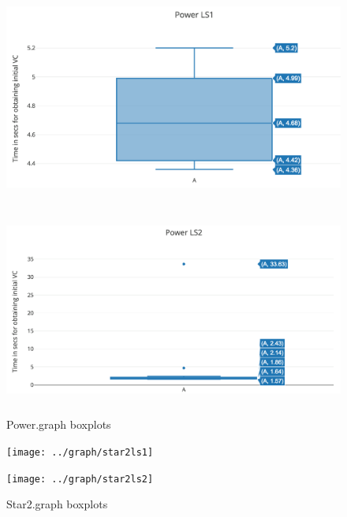 \begin{figure}[H]
\centering
\caption{Power.graph boxplots}
\begin{minipage}[b]{0.4\textwidth}
\includegraphics[height=7cm]{../graph/powerls1}
\end{minipage}
\hspace{0.6in}
\begin{minipage}[b]{0.4\textwidth}
\centering
\includegraphics[height=7cm]{../graph/powerls2}
\end{minipage}
\end{figure}

\begin{figure}[H]
\centering
\caption{Star2.graph boxplots}
\begin{minipage}[b]{0.4\textwidth}
\texttt{[image: ../graph/star2ls1]}
\end{minipage}
\hspace{0.6in}
\begin{minipage}[b]{0.4\textwidth}
\centering
\texttt{[image: ../graph/star2ls2]}
\end{minipage}
\end{figure}

\nocite{*}


